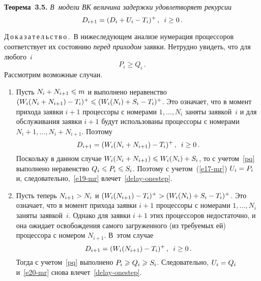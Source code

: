 \begin{multicols}{2}
\medskip

\noindent
\textbf{Теорема~3.5.}  \textit{В~модели ВК величина задержки
удовлетворяет рекурсии}
\begin{equation}
\label{delay-onestep} 
D_{i+1}=(D_{i}+U_{i}-T_{i})^{+}\,,\enskip i\ge 0\,.
\end{equation}

\smallskip

\noindent
Д\,о\,к\,а\,з\,а\,т\,е\,л\,ь\,с\,т\,в\,о\,.\
В нижеследующем анализе  нумерация процессоров соответствует их
состоянию {\it перед приходом}  заявки. Нетрудно увидеть, что для
любого~$i$
\begin{equation}
\label{pq}
P_i\geqslant Q_i\,.
\end{equation}
Рассмотрим возможные случаи.
\begin{enumerate}[1.] 
\item Пусть
$N_{i}+N_{i+1}\hm\leqslant m$ и выполнено неравенство
$(W_{i}(N_{i}+N_{i+1})-T_{i})^{+}\hm\leqslant
(W_{i}(N_{i})+S_{i}-T_{i})^{+}$. Это означает, что в момент прихода
заявки $i+1$ процессоры с номерами $1,\ldots,N_{i}$ заняты заявкой~$i$ 
и для обслуживания заявки $i+1$ будут использованы процессоры с
номерами $N_{i}+1,\ldots, N_{i}+N_{i+1}$.  Поэтому
\begin{equation}
D_{i+1}=(W_{i}(N_{i}+N_{i+1})-T_{i})^{+}\,,\enskip i\ge 0\,.
\label{e19-mr}
\end{equation}
Поскольку в данном  случае $W_{i}(N_{i}+N_{i+1})\hm\leqslant
W_{i}(N_{i})+S_{i}$, то с учетом~\eqref{pq} выполнено неравенство
$Q_{i}\hm\leqslant P_{i}\hm\leqslant S_{i}$. Поэтому с учетом~(\ref{e17-mr})
$U_{i}\hm=P_{i}$
и, следовательно,~\eqref{e19-mr} влечет~\eqref{delay-onestep}.
\item
Пусть теперь  $N_{i+1}\hm>N_{i}$ и
$(W_{i}(N_{i+1})\hm-T_{i})^{+}\hm>(W_{i}(N_{i})\hm+S_{i}-T_{i})^{+}$. Это
означает, что в момент прихода заявки $i+1$ процессоры с номерами
$1,\ldots,N_{i}$ заняты заявкой~$i$. Однако   для заявки $i+1$ этих
процессоров недостаточно, и она ожидает  освобождения самого
загруженного (из требуемых ей) процессора с номером $N_{i+1}$. 
В~этом случае
\begin{equation}
D_{i+1}=(W_{i}(N_{i+1})-T_{i})^{+}\,,\enskip i\ge 0\,.
\label{e20-mr}
\end{equation}
Тогда с учетом~\eqref{pq} выполнено $P_{i}\hm\geqslant Q_{i}\hm\geqslant
S_{i}$. Следовательно, $U_{i}\hm=Q_{i}$ и~\eqref{e20-mr} снова
влечет~\eqref{delay-onestep}.


\end{enumerate}
\end{multicols}
